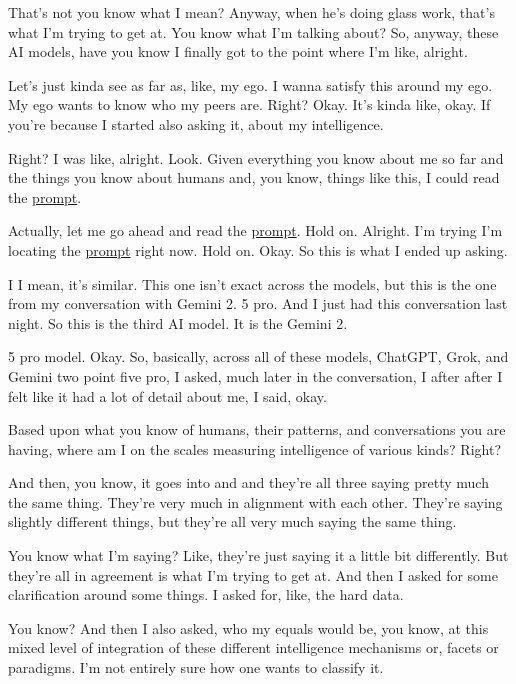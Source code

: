 \documentclass{article}
\begin{document}
That's not you know what I mean? Anyway, when he's doing glass work, that's what I'm trying to get at. You know what I'm talking about? So, anyway, these AI models, have you know I finally got to the point where I'm like, alright.

Let's just kinda see as far as, like, my ego. I wanna satisfy this around my ego. My ego wants to know who my peers are. Right? Okay. It's kinda like, okay. If you're because I started also asking it, about my intelligence.

Right? I was like, alright. Look. Given everything you know about me so far and the things you know about humans and, you know, things like this, I could read the \hyperlink{gloss:prompt}{prompt}.

Actually, let me go ahead and read the \hyperlink{gloss:prompt}{prompt}. Hold on. Alright. I'm trying I'm locating the \hyperlink{gloss:prompt}{prompt} right now. Hold on. Okay. So this is what I ended up asking.

I I mean, it's similar. This one isn't exact across the models, but this is the one from my conversation with Gemini 2. 5 pro. And I just had this conversation last night. So this is the third AI model. It is the Gemini 2.

5 pro model. Okay. So, basically, across all of these models, ChatGPT, Grok, and Gemini two point five pro, I asked, much later in the conversation, I after after I felt like it had a lot of detail about me, I said, okay.

Based upon what you know of humans, their patterns, and conversations you are having, where am I on the scales measuring intelligence of various kinds? Right?

And then, you know, it goes into and and they're all three saying pretty much the same thing. They're very much in alignment with each other. They're saying slightly different things, but they're all very much saying the same thing.

You know what I'm saying? Like, they're just saying it a little bit differently. But they're all in agreement is what I'm trying to get at. And then I asked for some clarification around some things. I asked for, like, the hard data.

You know? And then I also asked, who my equals would be, you know, at this mixed level of integration of these different intelligence mechanisms or, facets or paradigms. I'm not entirely sure how one wants to classify it.
\end{document}

